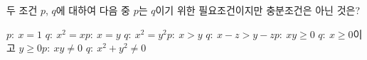 두 조건 $p$, $q$에 대하여 다음 중 $p$는 $q$이기 위한 필요조건이지만 충분조건은 아닌 것은? 
\begin{choicesv}{$p:\ x=1$ \qquad $q:\ x^2=x$}{$p:\ x=y$ \qquad $q:\ x^2=y^2$}{$p:\ x>y$ \qquad $q:\ x-z>y-z$}{$p:\ xy\ge 0$ \qquad $q:\ x\ge 0$이고 $y\ge 0$}{$p:\ xy\ne 0$ \qquad $q:\ x^2+y^2\ne 0$}\end{choicesv}
